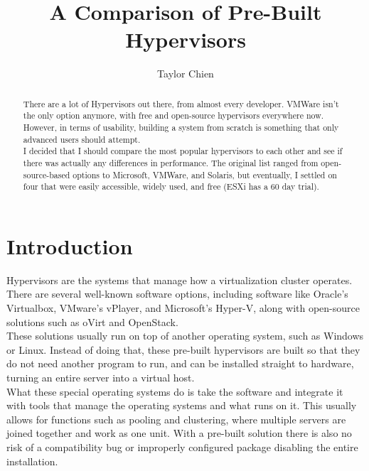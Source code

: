 \documentclass[12pt]{spieman}  %
\title{A Comparison of Pre-Built Hypervisors}
\author[a]{Taylor Chien}
\affil[a]{SUNY Polytechnic Institute, Computer Science Department, 100 Horatio Street, Utica, NY, 13502}
\begin{document}
 
\maketitle

\begin{abstract}
There are a lot of Hypervisors out there, from almost every developer. VMWare isn't the only option anymore, with free and open-source hypervisors everywhere now. However, in terms of usability, building a system from scratch is something that only advanced users should attempt.\\

I decided that I should compare the most popular hypervisors to each other and see if there was actually any differences in performance. The original list ranged from open-source-based options to Microsoft, VMWare, and Solaris, but eventually, I settled on four that were easily accessible, widely used, and free (ESXi has a 60 day trial).

\end{abstract}


\section{Introduction}

Hypervisors are the systems that manage how a virtualization cluster operates. There are several well-known software options, including software like Oracle’s Virtualbox, VMware’s vPlayer, and Microsoft’s Hyper-V, along with open-source solutions such as oVirt and OpenStack.\\

These solutions usually run on top of another operating system, such as Windows or Linux. Instead of doing that, these pre-built hypervisors are built so that they do not need another program to run, and can be installed straight to hardware, turning an entire server into a virtual host.\\

What these special operating systems do is take the software and integrate it with tools that manage the operating systems and what runs on it. This usually allows for functions such as pooling and clustering, where multiple servers are joined together and work as one unit. With a pre-built solution there is also no risk of a compatibility bug or improperly configured package disabling the entire installation.\\
\end{document}
